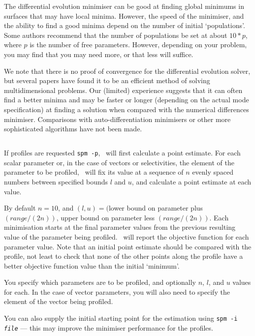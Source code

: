 The differential evolution minimiser can be good at finding global minimums in surfaces that may have local minima. However, the speed of the minimiser, and the ability to find a good minima depend on the number of initial `populations'. Some authors recommend that the number of populations be set at about $10*p$, where $p$ is the number of free parameters. However, depending on your problem, you may find that you may need more, or that less will suffice.

We note that there is no proof of convergence for the differential evolution solver, but several papers have found it to be an efficient method of solving multidimensional problems. Our (limited) experience suggests that it can often find a better minima and may be faster or longer (depending on the actual mode specification) at finding a solution when compared with the numerical differences minimiser. Comparisons with auto-differentiation minimisers or other more sophisticated algorithms have not been made. 

\subsection{\label{sec:estimate-profiles}}

If profiles are requested \texttt{spm -p}, \SPM\ will first calculate a point estimate. For each scalar parameter or, in the case of vectors or selectivities, the element of the parameter to be profiled, \SPM\ will fix its value at a sequence of $n$ evenly spaced numbers between specified bounds $l$ and $u$, and calculate a point estimate at each value. 

By default $n=10$, and $(l, u)=($lower bound on parameter plus $(range/(2n))$, upper bound on parameter less $(range/(2n))$. Each minimisation starts at the final parameter values from the previous resulting value of the parameter being profiled. \SPM\ will report the objective function for each parameter value. Note that an initial point estimate should be compared with the profile, not least to check that none of the other points along the profile have a better objective function value than the initial `minimum'.

You specify which parameters are to be profiled, and optionally $n$, $l$, and $u$ values for each. In the case of vector parameters, you will also need to specify the element of the vector being profiled. 

You can also supply the initial starting point for the estimation using \texttt{spm -i \emph{file}} --- this may improve the minimiser performance for the profiles.


